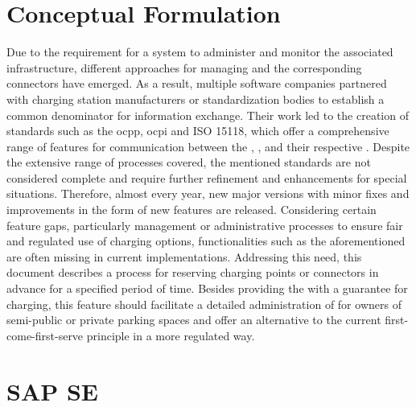 \section{Conceptual Formulation}
\label{ch:Introduction:sec:Conceptual Formulation}

Due to the requirement for a system to administer and monitor the associated infrastructure, different approaches for managing  and the corresponding connectors have emerged.
As a result, multiple software companies partnered with charging station manufacturers or standardization bodies to establish a common denominator for information exchange.
Their work led to the creation of standards such as the \acrfull{ocpp}, \acrfull{ocpi} and ISO 15118, which offer a comprehensive range of features for communication between the , , and their respective .
Despite the extensive range of processes covered, the mentioned standards are not considered complete and require further refinement and enhancements for special situations.
Therefore, almost every year, new major versions with minor fixes and improvements in the form of new features are released. 
Considering certain feature gaps, particularly management or administrative processes to ensure fair and regulated use of charging options, functionalities such as the aforementioned are often missing in current implementations. 
Addressing this need, this document describes a process for reserving charging points or connectors in advance for a specified period of time.
Besides providing the  with a guarantee for charging, this feature should facilitate a detailed administration of  for owners of semi-public or private parking spaces and offer an alternative to the current first-come-first-serve principle in a more regulated way.

\section{SAP SE}
\label{ch:Introduction:sec:SAP SE}

